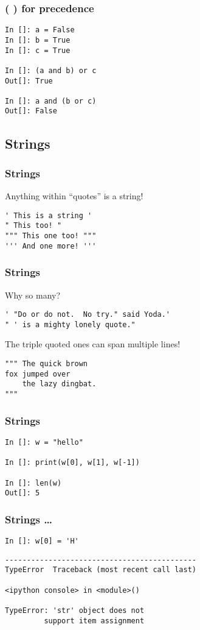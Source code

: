 \documentclass[14pt,compress]{beamer}
\begin{document}
\begin{frame}[fragile]
  \frametitle{( )  for precedence}
  \begin{lstlisting}
In []: a = False
In []: b = True
In []: c = True

In []: (a and b) or c
Out[]: True

In []: a and (b or c)
Out[]: False
  \end{lstlisting}
\end{frame}

\subsection{Strings}

\begin{frame}[fragile]
\frametitle{Strings}
Anything within ``quotes'' is a string!
\begin{lstlisting}
' This is a string '
" This too! "
""" This one too! """
''' And one more! '''
\end{lstlisting}
\end{frame}

\begin{frame}[fragile]
\frametitle{Strings}
Why so many?
\begin{lstlisting}
' "Do or do not.  No try." said Yoda.'
" ' is a mighty lonely quote."
\end{lstlisting}
The triple quoted ones can span multiple lines!

\begin{lstlisting}
""" The quick brown
fox jumped over
    the lazy dingbat.
"""
\end{lstlisting}
\end{frame}

\begin{frame}[fragile]
  \frametitle{Strings}
  \begin{lstlisting}
In []: w = "hello"

In []: print(w[0], w[1], w[-1])

In []: len(w)
Out[]: 5
  \end{lstlisting}
\end{frame}

\begin{frame}[fragile]
  \frametitle{Strings \ldots}
  \begin{lstlisting}
In []: w[0] = 'H'
  \end{lstlisting}
  \pause
  \begin{lstlisting}
--------------------------------------------
TypeError  Traceback (most recent call last)

<ipython console> in <module>()

TypeError: 'str' object does not
         support item assignment
  \end{lstlisting}
\end{frame}
\end{document}
